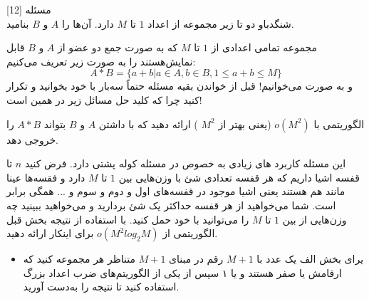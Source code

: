 ‌مسئله [12]
\\
شنگدباو دو تا زیر مجموعه از اعداد $1$ تا $M$ دارد. آن‌ها را $A$ و $B$ بنامید.

مجموعه تمامی اعدادی از $1$ تا $M$ که به صورت جمع دو عضو از $A$ و $B$ قابل نمایش‌هستند را به صورت زیر تعریف می‌کنیم:
$$A * B = \{a + b | a \in A , b \in B, 1 \le a + b \le M\}$$
و به صورت
می‌خوانیم! قبل از خواندن بقیه مسئله حتماً سه‌بار با خود بخوانید
و تکرار کنید چرا که کلید حل مسائل زیر در همین است!

الگوریتمی با 
$o(M^2)$
(یعنی بهتر از 
$M^2$
)
ارائه دهید که با داشتن $A$ و $B$ بتواند $A*B$ را خروجی دهد.

این مسئله کاربرد های زیادی به خصوص در مسئله کوله پشتی دارد. فرض کنید $n$ تا قفسه اشیا داریم که هر قفسه تعدادی شئ با وزن‌هایی بین $1$ تا $M$ دارد و فقسه‌ها عینا مانند هم هستند یعنی اشیا موجود در قفسه‌های اول و دوم و سوم و ... همگی برابر است. شما می‌خواهید از هر قفسه حداکثر یک شئ بردارید و می‌خواهید ببینید چه وزن‌هایی از بین $1$ تا $M$ را می‌توانید با خود حمل کنید. با استفاده از نتیجه بخش قبل الگوریتمی از
$o(M^2 log_2M)$
برای اینکار ارائه دهید.

\begin{itemize}
	\item[راهنمایی: ]
	یرای بخش الف یک عدد با $M+1$ رقم در مبنای $M+1$ متناظر هر مجموعه کنید که ارقامش یا صفر هستند و یا ۱ سپس از یکی از الگوریتم‌های ضرب اعداد بزرگ استفاده کنید تا نتیجه را به‌دست آورید.
\end{itemize}




